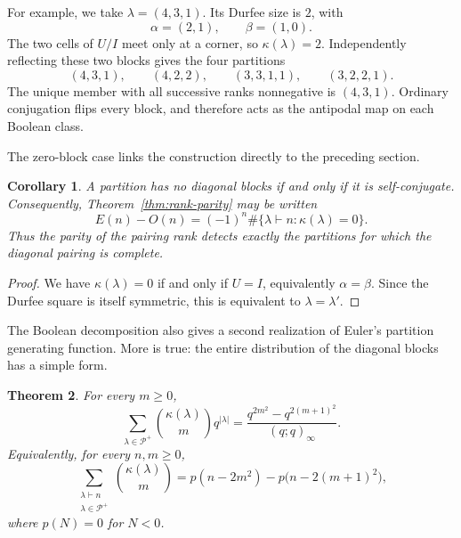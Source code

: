 \documentclass[11pt]{article}
\newtheorem{theorem}{Theorem}[section]
\newtheorem{corollary}[theorem]{Corollary}
\theoremstyle{definition}
\theoremstyle{remark}
\begin{document}
For example, we take $\lambda=(4,3,1)$.  Its Durfee size is $2$, with
\[
 \alpha=(2,1),
 \qquad
 \beta=(1,0).
\]
The two cells of $U/I$ meet only at a corner, so $\kappa(\lambda)=2$.  Independently reflecting these two blocks gives the four partitions
\[
 (4,3,1),\qquad (4,2,2),\qquad (3,3,1,1),\qquad (3,2,2,1).
\]
The unique member with all successive ranks nonnegative is $(4,3,1)$.  Ordinary conjugation flips every block, and therefore acts as the antipodal map on each Boolean class.

The zero-block case links the construction directly to the preceding section.

\begin{corollary}\label{cor:zero-block-self-conjugate}
A partition has no diagonal blocks if and only if it is self-conjugate.  Consequently, Theorem~\ref{thm:rank-parity} may be written
\[
 E(n)-O(n)
 =(-1)^n\#\{\lambda\vdash n:\kappa(\lambda)=0\}.
\]
Thus the parity of the pairing rank detects exactly the partitions for which the diagonal pairing is complete.
\end{corollary}

\begin{proof}
We have $\kappa(\lambda)=0$ if and only if $U=I$, equivalently $\alpha=\beta$.  Since the Durfee square is itself symmetric, this is equivalent to $\lambda=\lambda'$.
\end{proof}

The Boolean decomposition also gives a second realization of Euler's partition generating function.  More is true: the entire distribution of the diagonal blocks has a simple form.

\begin{theorem}\label{thm:refined-diagonal-pairing}
For every $m\geq0$,
\begin{equation}\label{eq:block-moment-gf}
 \sum_{\lambda\in\mathcal P^+}
 \binom{\kappa(\lambda)}{m}q^{|\lambda|}
 =\frac{q^{2m^2}-q^{2(m+1)^2}}{(q;q)_\infty}.
\end{equation}
Equivalently, for every $n,m\geq0$,
\begin{equation}\label{eq:block-moment-coeff}
 \sum_{\substack{\lambda\vdash n\\ \lambda\in\mathcal P^+}}
 \binom{\kappa(\lambda)}{m}
 =p(n-2m^2)-p\bigl(n-2(m+1)^2\bigr),
\end{equation}
where $p(N)=0$ for $N<0$.
\end{theorem}
\end{document}
